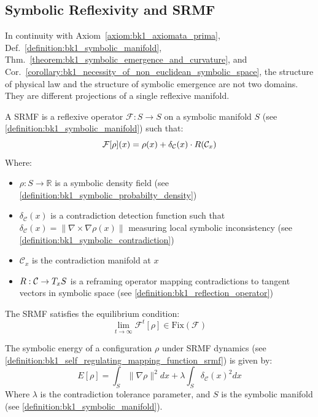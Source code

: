 \subsection{Symbolic Reflexivity and SRMF}
\label{subsec:bk1_symbolic_reflexivity_and_srmf}
\begin{axiom}
\label{axiom:bk1_symbolic_primacy}
In continuity with Axiom~\ref{axiom:bk1_axiomata_prima}, Def.~\ref{definition:bk1_symbolic_manifold}, Thm.~\ref{theorem:bk1_symbolic_emergence_and_curvature}, and Cor.~\ref{corollary:bk1_necessity_of_non_euclidean_symbolic_space}, the structure of physical law and the structure of symbolic emergence are not two domains. They are different projections of a single reflexive manifold.
\end{axiom}
\begin{definition}
\label{definition:bk1_self_regulating_mapping_function_srmf}
A SRMF is a reflexive operator $\mathcal{F}: S \to S$ on a symbolic manifold $S$ (see \ref{definition:bk1_symbolic_manifold}) such that:
\[
\mathcal{F}[\rho](x) = \rho(x) + \delta_{\mathcal{C}}(x) \cdot R(\mathcal{C}_x)
\]
Where:
\begin{itemize}
\item $\rho: S \to \mathbb{R}$ is a symbolic density field (see \ref{definition:bk1_symbolic_probabilty_density})
\item $\delta_{\mathcal{C}}(x)$ is a contradiction detection function such that $\delta_{\mathcal{C}}(x) = \|\nabla \times \nabla \rho(x)\|$ measuring local symbolic inconsistency (see \ref{definition:bk1_symbolic_contradiction})
\item $\mathcal{C}_x$ is the contradiction manifold at $x$
\item $R: \mathcal{C} \to T_xS$ is a reframing operator mapping contradictions to tangent vectors in symbolic space (see \ref{definition:bk1_reflection_operator})
\end{itemize}
The SRMF satisfies the equilibrium condition:
\[
\lim_{t \to \infty} \mathcal{F}^t[\rho] \in \text{Fix}(\mathcal{F})
\]
\end{definition}
\begin{definition}
\label{definition:bk1_srmf_energy_functional}
The symbolic energy of a configuration $\rho$ under SRMF dynamics (see \ref{definition:bk1_self_regulating_mapping_function_srmf}) is given by:
\[
E[\rho] = \int_S \|\nabla \rho\|^2 dx + \lambda \int_S \delta_{\mathcal{C}}(x)^2 dx
\]
Where $\lambda$ is the contradiction tolerance parameter, and $S$ is the symbolic manifold (see \ref{definition:bk1_symbolic_manifold}).
\end{definition}

